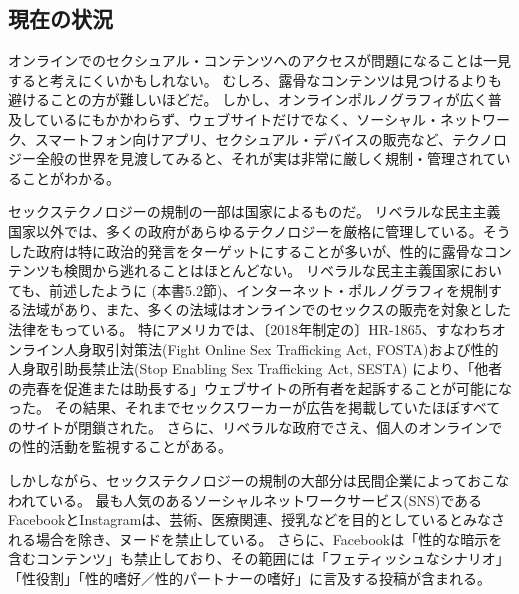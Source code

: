 \documentclass[paper=a4,book,openany]{jlreq}
\begin{document}
\subsection{現在の状況}

オンラインでのセクシュアル・コンテンツへのアクセスが問題になることは一見すると考えにくいかもしれない。
むしろ、露骨なコンテンツは見つけるよりも避けることの方が難しいほどだ。
しかし、オンラインポルノグラフィが広く普及しているにもかかわらず、ウェブサイトだけでなく、ソーシャル・ネットワーク、スマートフォン向けアプリ、セクシュアル・デバイスの販売など、テクノロジー全般の世界を見渡してみると、それが実は非常に厳しく規制・管理されていることがわかる。

セックステクノロジーの規制の一部は国家によるものだ。
リベラルな民主主義国家以外では、多くの政府があらゆるテクノロジーを厳格に管理している。そうした政府は特に政治的発言をターゲットにすることが多いが、性的に露骨なコンテンツも検閲から逃れることはほとんどない。
リベラルな民主主義国家においても、前述したように (本書5.2節)、インターネット・ポルノグラフィを規制する法域があり、また、多くの法域はオンラインでのセックスの販売を対象とした法律をもっている。
特にアメリカでは、〔2018年制定の〕HR-1865、すなわちオンライン人身取引対策法(Fight Online Sex Trafficking Act, FOSTA)および性的人身取引助長禁止法(Stop Enabling Sex Trafficking Act, SESTA) により、「他者の売春を促進または助長する」ウェブサイトの所有者を起訴することが可能になった。
その結果、それまでセックスワーカーが広告を掲載していたほぼすべてのサイトが閉鎖された\citep{witt18:_after_closur_backp_increas_vulner}。
さらに、リベラルな政府でさえ、個人のオンラインでの性的活動を監視することがある\citep{owen13:_nsa_spied_porn_habit_target_radic}。

しかしながら、セックステクノロジーの規制の大部分は民間企業によっておこなわれている。
最も人気のあるソーシャルネットワークサービス(SNS)であるFacebookとInstagramは、芸術、医療関連、授乳などを目的としているとみなされる場合を除き、ヌードを禁止している。
さらに、Facebookは「性的な暗示を含むコンテンツ」も禁止しており、その範囲には「フェティッシュなシナリオ」「性役割」「性的嗜好／性的パートナーの嗜好」に言及する投稿が含まれる。
\end{document}
